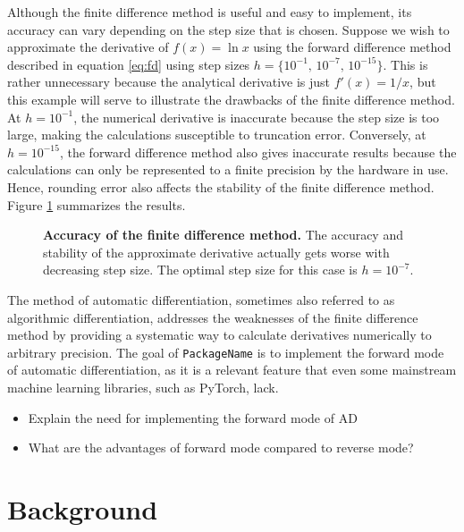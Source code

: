     Although the finite difference method is useful and easy to implement, its 
    accuracy can vary depending on the step size that is chosen. Suppose we wish
    to approximate the derivative of $f(x)=\ln x$ using the forward difference 
    method described in equation \eqref{eq:fd} using step sizes $h=\{10^{-1},\,
    10^{-7},\,10^{-15}\}$. This is rather unnecessary because the analytical 
    derivative is just $f'(x) = 1/x$, but this example will serve to illustrate 
    the drawbacks of the finite difference method. At $h=10^{-1}$, the numerical
    derivative is inaccurate because the step size is too large, making the 
    calculations susceptible to truncation error. Conversely, at $h=10^{-15}$, 
    the forward difference method also gives inaccurate results because the 
    calculations can only be represented to a finite precision by the hardware 
    in use. Hence, rounding error also affects the stability of the finite 
    difference method. Figure \ref{fig:fd-accuracy} summarizes the results.
    \begin{figure}
        \centering
        
        \caption{\textbf{Accuracy of the finite difference method.} The accuracy
        and stability of the approximate derivative actually gets worse with 
        decreasing step size. The optimal step size for this case is 
        $h=10^{-7}$.}
        \label{fig:fd-accuracy}
    \end{figure}
    
    The method of automatic differentiation, sometimes also referred to as 
    algorithmic differentiation, addresses the weaknesses of the finite 
    difference method by providing a systematic way to calculate derivatives 
    numerically to arbitrary precision. The goal of \texttt{PackageName} is to 
    implement the forward mode of automatic differentiation, as it is a relevant
    feature that even some mainstream machine learning libraries, such as 
    PyTorch, lack. 
    \begin{itemize}
        \item Explain the need for implementing the forward mode of AD
        \item What are the advantages of forward mode compared to reverse mode?
    \end{itemize}
    \section*{Background}
    
